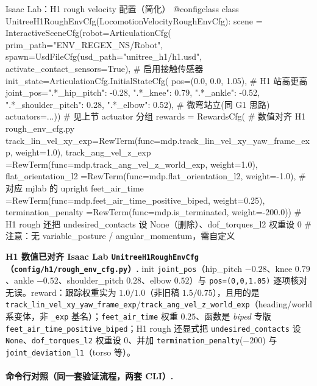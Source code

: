 \begin{codebox}[Python]{Isaac Lab：H1 rough velocity 配置（简化）}
@configclass
class UnitreeH1RoughEnvCfg(LocomotionVelocityRoughEnvCfg):
    scene = InteractiveSceneCfg(robot=ArticulationCfg(
        prim_path="{ENV_REGEX_NS}/Robot",
        spawn=UsdFileCfg(usd_path="unitree_h1/h1.usd",
                         activate_contact_sensors=True),   # 启用接触传感器
        init_state=ArticulationCfg.InitialStateCfg(
            pos=(0.0, 0.0, 1.05),                          # H1 站高更高
            joint_pos={".*_hip_pitch": -0.28, ".*_knee": 0.79,
                       ".*_ankle": -0.52, ".*_shoulder_pitch": 0.28,
                       ".*_elbow": 0.52}),                 # 微弯站立(同 G1 思路)
        actuators={...}))                                  # 见上节 actuator 分组
    rewards = RewardsCfg(                              # 数值对齐 H1 rough_env_cfg.py
        track_lin_vel_xy_exp=RewTerm(func=mdp.track_lin_vel_xy_yaw_frame_exp, weight=1.0),
        track_ang_vel_z_exp =RewTerm(func=mdp.track_ang_vel_z_world_exp,      weight=1.0),
        flat_orientation_l2 =RewTerm(func=mdp.flat_orientation_l2, weight=-1.0),  # 对应 mjlab 的 upright
        feet_air_time       =RewTerm(func=mdp.feet_air_time_positive_biped, weight=0.25),
        termination_penalty =RewTerm(func=mdp.is_terminated, weight=-200.0))
        # H1 rough 还把 undesired_contacts 设 None（删除）、dof_torques_l2 权重设 0
        # 注意：无 variable_posture / angular_momentum，需自定义
\end{codebox}

\begin{note}
\textbf{H1 数值已对齐 Isaac Lab \texttt{UnitreeH1RoughEnvCfg}（\texttt{config/h1/rough\_env\_cfg.py}）.}\;
init \texttt{joint\_pos}（hip\_pitch $-0.28$、knee $0.79$、ankle $-0.52$、shoulder\_pitch $0.28$、elbow $0.52$）与 \texttt{pos=(0,0,1.05)} 逐项核对无误。reward：跟踪权重实为 \emph{$1.0/1.0$}（非旧稿 $1.5/0.75$），且用的是 \texttt{track\_lin\_vel\_xy\_yaw\_frame\_exp}/\texttt{track\_ang\_vel\_z\_world\_exp}（heading/world 系变体，非 \texttt{\_exp} 基名）；\texttt{feet\_air\_time} 权重 $0.25$、函数是 \emph{biped} 专版 \texttt{feet\_air\_time\_positive\_biped}；H1 rough 还显式把 \texttt{undesired\_contacts} 设 \texttt{None}、\texttt{dof\_torques\_l2} 权重设 $0$、并加 \texttt{termination\_penalty}($-200$) 与 \texttt{joint\_deviation\_l1}（torso 等）。
\end{note}

\paragraph{命令行对照（同一套验证流程，两套 CLI）.}

